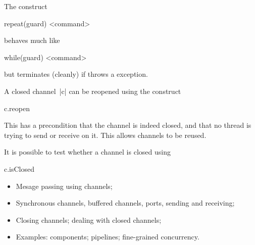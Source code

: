\documentclass[notes,color]{sepslide0}
\begin{document}
\begin{slide}

The construct
%
\begin{scala}
  repeat(guard){ <command> }
\end{scala}
%
behaves much like
\begin{scala}
  while(guard){ <command> }
\end{scala}
but terminates (cleanly) if  throws a 
exception.

A closed channel~|c| can be reopened using the construct
\begin{scala}
  c.reopen
\end{scala}
%
This has a precondition that the channel is indeed closed, and that no thread
is trying to send or receive on it.  This allows channels to be reused.

It is possible to test whether a channel is closed using
%
\begin{scala}
  c.isClosed
\end{scala}
\end{slide}



\begin{slide}

\begin{itemize}
\item 
Mesage passing using channels;

\item
Synchronous channels, buffered channels, ports, sending and receiving;

\item
Closing channels; dealing with closed channels;

\item
Examples: components; pipelines; fine-grained concurrency.
\end{itemize}
\end{slide}
\end{document}

